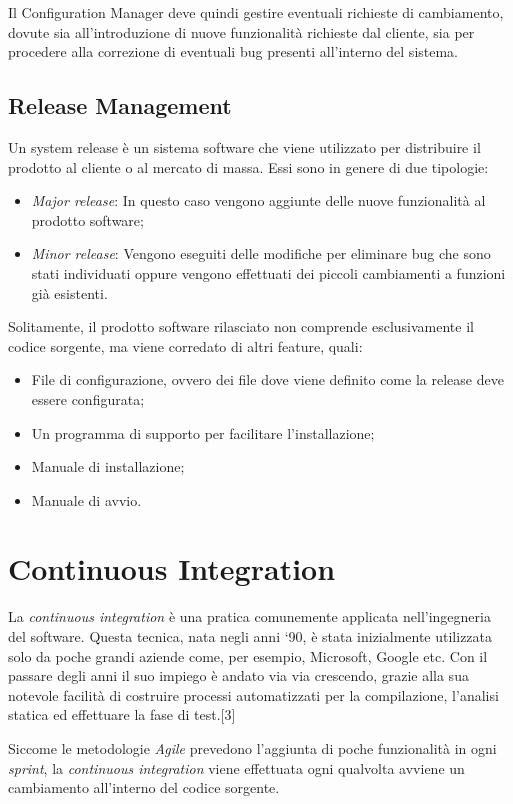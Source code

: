 Il Configuration Manager deve quindi gestire eventuali richieste di
cambiamento, dovute sia all’introduzione di nuove funzionalità richieste dal
cliente, sia per procedere alla correzione di eventuali bug presenti all’interno del
sistema. 

\subsection{Release Management}
Un system release è un sistema software che viene utilizzato per distribuire il
prodotto al cliente o al mercato di massa. Essi sono in genere di due tipologie:
\begin{itemize}
	\item \emph{Major release}: In questo caso vengono aggiunte delle nuove funzionalità al prodotto software;
	\item \emph{Minor release}: Vengono eseguiti delle modifiche per eliminare bug che sono stati individuati oppure vengono effettuati dei piccoli cambiamenti a
	funzioni già esistenti.
\end{itemize}

Solitamente, il prodotto software rilasciato non comprende esclusivamente il
codice sorgente, ma viene corredato di altri feature, quali:
\begin{itemize}
	\item File di configurazione, ovvero dei file dove viene definito come la release
	deve essere configurata;
	\item Un programma di supporto per facilitare l’installazione;
	\item Manuale di installazione;
	\item Manuale di avvio.
\end{itemize}
\section{Continuous Integration}
La \emph{continuous integration} è una pratica comunemente applicata
nell’ingegneria del software. Questa tecnica, nata negli anni ‘90, è stata inizialmente utilizzata solo da poche grandi aziende come, per esempio, Microsoft, Google etc. Con il passare degli anni il suo impiego è andato via via crescendo, grazie alla sua notevole facilità di costruire processi automatizzati per la compilazione, l’analisi statica ed effettuare la fase di test.[3]

Siccome le metodologie \emph{Agile} prevedono l’aggiunta di poche funzionalità in ogni \emph{sprint}, la \emph{continuous integration} viene effettuata ogni qualvolta avviene un cambiamento all’interno del codice sorgente.

